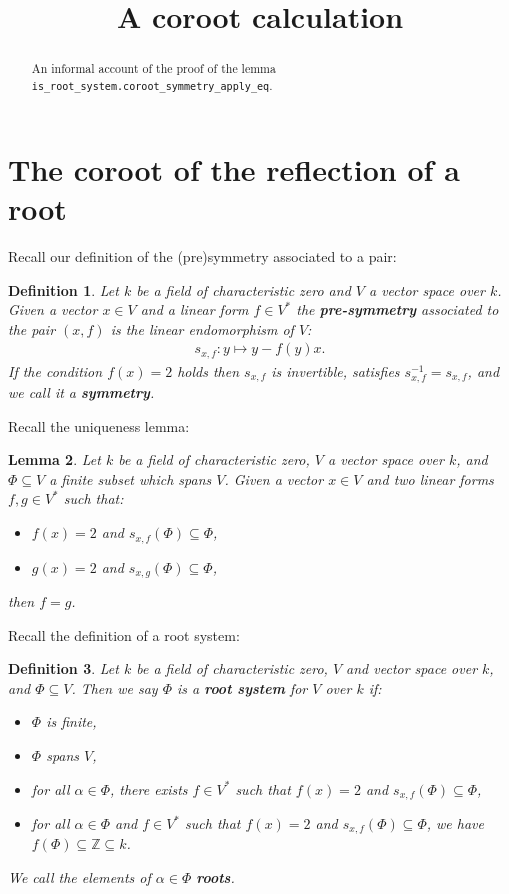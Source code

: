 \documentclass[12pt, a4paper]{article}
\title{A coroot calculation}
\newtheorem{lemma}{Lemma}[section]
\newtheorem{definition}[lemma]{Definition}
\begin{document}
\maketitle

\begin{abstract}
  An informal account of the proof of the lemma\\
  \texttt{is\_root\_system.coroot\_symmetry\_apply\_eq}.
\end{abstract}

\section{The coroot of the reflection of a root}

Recall our definition of the (pre)symmetry associated to a pair:
\begin{definition}
  Let $k$ be a field of characteristic zero and $V$ a vector space over $k$. Given a vector
  $x \in V$ and a linear form $f \in V^*$ the \textbf{pre-symmetry} associated to the pair $(x, f)$
  is the linear endomorphism of $V$:
  \begin{align*}
    s_{x,f} : y \mapsto y - f(y)x.
  \end{align*}
  If the condition $f(x) = 2$
  holds then $s_{x,f}$ is invertible, satisfies $s_{x,f}^{-1} = s_{x,f}$, and we call it a
  \textbf{symmetry}.
\end{definition}

Recall the uniqueness lemma:
\begin{lemma}\label{lem:uniqueness}
  Let $k$ be a field of characteristic zero, $V$ a vector space over $k$, and $\Phi \subseteq V$
  a finite subset which spans $V$. Given a vector $x \in V$ and two linear forms $f, g \in V^*$
  such that:
  \begin{itemize}
    \item $f(x) = 2$ and $s_{x, f}(\Phi) \subseteq \Phi$,
    \item $g(x) = 2$ and $s_{x, g}(\Phi) \subseteq \Phi$,
  \end{itemize}
  then $f = g$.
\end{lemma}

Recall the definition of a root system:
\begin{definition}
  Let $k$ be a field of characteristic zero, $V$ and vector space over $k$, and
  $\Phi \subseteq V$. Then we say $\Phi$ is a \textbf{root system} for $V$ over $k$ if:
  \begin{itemize}
    \item $\Phi$ is finite,
    \item $\Phi$ spans $V$,
    \item for all $\alpha \in \Phi$, there exists $f \in V^*$ such that $f(x) = 2$ and
    $s_{x, f}(\Phi) \subseteq \Phi$,
    \item for all $\alpha \in \Phi$ and $f \in V^*$ such that $f(x) = 2$ and
    $s_{x, f}(\Phi) \subseteq \Phi$, we have $f(\Phi) \subseteq \mathbb{Z} \subseteq k$.
  \end{itemize}
  We call the elements of $\alpha \in \Phi$ \textbf{roots}.
\end{definition}
\end{document}
